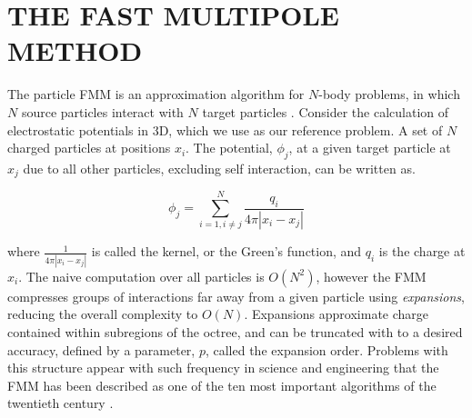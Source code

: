 \documentclass{IEEEcsmag}
\begin{document}


\section{THE FAST MULTIPOLE METHOD}

The particle FMM is an approximation algorithm for $N$-body problems, in which $N$ source particles interact with $N$ target particles \cite{Greengard1987}. Consider the calculation of electrostatic potentials in 3D, which we use as our reference problem. A set of $N$ charged particles at positions $x_i$. The potential, $\phi_j$, at a given target particle at $x_j$ due to all other particles, excluding self interaction, can be written as.

\begin{equation}
    \phi_j = \sum_{i=1, i \neq j}^{N} \frac{q_i}{4 \pi| x_i-x_j |}
    \label{eq:laplace_kernel}
\end{equation}

where $\frac{1}{4 \pi| x_i-x_j|}$ is called the kernel, or the Green's function, and $q_i$ is the charge at $x_i$. The naive computation over all particles is $O(N^2)$, however the FMM compresses groups of interactions far away from a given particle using \textit{expansions}, reducing the overall complexity to $O(N)$. Expansions approximate charge contained within subregions of the octree, and can be truncated with to a desired accuracy, defined by a parameter, $p$, called the expansion order. Problems with this structure appear with such frequency in science and engineering that the FMM has been described as one of the ten most important algorithms of the twentieth century \cite{Cipra2000}.
\end{document}
